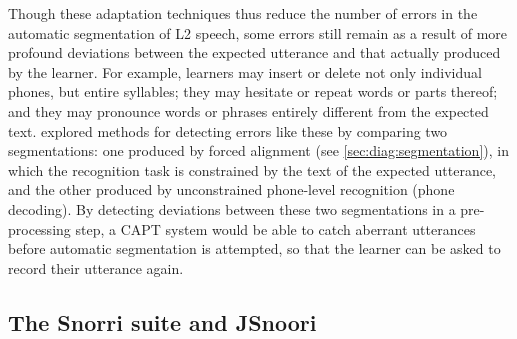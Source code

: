 	Though these adaptation techniques thus reduce the number of errors in the automatic segmentation of L2 speech, some errors still remain as a result of more profound deviations between the expected utterance and that actually produced by the learner. For example, learners may insert or delete not only individual phones, but entire syllables; they may hesitate or repeat words or parts thereof; and they may pronounce words or phrases entirely different from the expected text. \textcite{Bonneau2012,Orosanu2012} explored methods for detecting errors like these by comparing two segmentations: one produced by forced alignment (see \cref{sec:diag:segmentation}), in which the recognition task is constrained by the text of the expected utterance, and the other produced by unconstrained phone-level recognition (phone decoding). 
	By detecting deviations between these two segmentations in a pre-processing step, a CAPT system would be able to catch aberrant utterances before automatic segmentation is attempted, so that the learner can be asked to record their utterance again.
	
	
		
	
	
	
	\subsection{The Snorri suite and JSnoori}
	\label{sec:capt:snoori}
	
